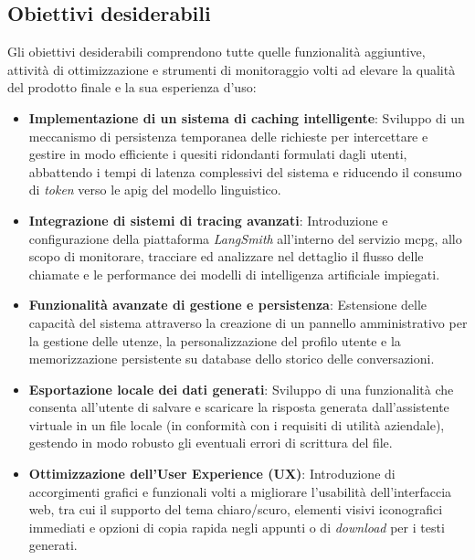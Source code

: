 \subsection{Obiettivi desiderabili}
Gli obiettivi desiderabili comprendono tutte quelle funzionalità aggiuntive, attività di ottimizzazione e strumenti di monitoraggio volti ad elevare la qualità del prodotto finale e la sua esperienza d'uso:

\begin{itemize}
    \item \textbf{Implementazione di un sistema di caching intelligente}: Sviluppo di un meccanismo di persistenza temporanea delle richieste per intercettare e gestire in modo efficiente i quesiti ridondanti formulati dagli utenti, abbattendo i tempi di latenza complessivi del sistema e riducendo il consumo di \textit{token} verso le \gls{apig} del modello linguistico.
    \item \textbf{Integrazione di sistemi di tracing avanzati}: Introduzione e configurazione della piattaforma \textit{LangSmith} all'interno del servizio \gls{mcpg}, allo scopo di monitorare, tracciare ed analizzare nel dettaglio il flusso delle chiamate e le performance dei modelli di intelligenza artificiale impiegati.
    \item \textbf{Funzionalità avanzate di gestione e persistenza}: Estensione delle capacità del sistema attraverso la creazione di un pannello amministrativo per la gestione delle utenze, la personalizzazione del profilo utente e la memorizzazione persistente su database dello storico delle conversazioni.
    \item \textbf{Esportazione locale dei dati generati}: Sviluppo di una funzionalità che consenta all'utente di salvare e scaricare la risposta generata dall'assistente virtuale in un file locale (in conformità con i requisiti di utilità aziendale), gestendo in modo robusto gli eventuali errori di scrittura del file.
    \item \textbf{Ottimizzazione dell'User Experience (UX)}: Introduzione di accorgimenti grafici e funzionali volti a migliorare l'usabilità dell'interfaccia web, tra cui il supporto del tema chiaro/scuro, elementi visivi iconografici immediati e opzioni di copia rapida negli appunti o di \textit{download} per i testi generati.
\end{itemize}